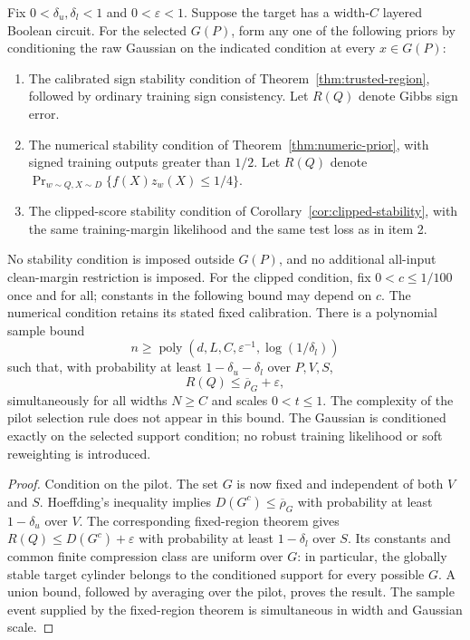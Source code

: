 \begin{theorem}
\label{thm:unlabeled-trusted-region}
Fix $0<\delta_u,\delta_l<1$ and $0<\varepsilon<1$.
Suppose the target has a width-$C$ layered Boolean circuit. For the selected
$G(P)$, form any one of the following priors by conditioning the raw Gaussian
on the indicated condition at every $x\in G(P)$:
\begin{enumerate}
\item The calibrated sign stability condition of
Theorem~\ref{thm:trusted-region}, followed by ordinary training sign
consistency. Let $R(Q)$ denote Gibbs sign error.
\item The numerical stability condition of
Theorem~\ref{thm:numeric-prior}, with signed training outputs greater
than $1/2$. Let $R(Q)$ denote
$\Pr_{w\sim Q,X\sim D}\{f(X)z_w(X)\le1/4\}$.
\item The clipped-score stability condition of
Corollary~\ref{cor:clipped-stability}, with the same training-margin
likelihood and the same test loss as in item 2.
\end{enumerate}
No stability condition is imposed outside $G(P)$, and no additional
all-input clean-margin restriction is imposed. For the clipped condition, fix $0<c\le1/100$ once and for all;
constants in the following bound may depend on $c$. The numerical
condition retains its stated fixed calibration. There is a
polynomial sample bound
\[
 n\ge\operatorname{poly}
       (d,L,C,\varepsilon^{-1},\log(1/\delta_l))
\]
such that, with probability at least $1-\delta_u-\delta_l$ over $P,V,S$,
\[
 R(Q)\le\overline\rho_G+\varepsilon,
\]
simultaneously for all widths $N\ge C$ and scales $0<t\le1$.
The complexity of the pilot selection rule does not appear in this bound.
The Gaussian is conditioned exactly on the selected support condition;
no robust training likelihood or soft reweighting is introduced.
\end{theorem}

\begin{proof}
Condition on the pilot. The set $G$ is now fixed and independent of both
$V$ and $S$. Hoeffding's inequality implies
$D(G^c)\le\overline\rho_G$ with probability at least $1-\delta_u$ over
$V$. The corresponding fixed-region theorem gives
$R(Q)\le D(G^c)+\varepsilon$ with probability at least $1-\delta_l$ over
$S$. Its constants and common finite compression class are uniform over
$G$: in particular, the globally stable target cylinder belongs to the
conditioned support for every possible $G$. A union bound, followed by
averaging over the pilot, proves the result. The sample event supplied by
the fixed-region theorem is simultaneous in width and Gaussian scale.
\end{proof}

